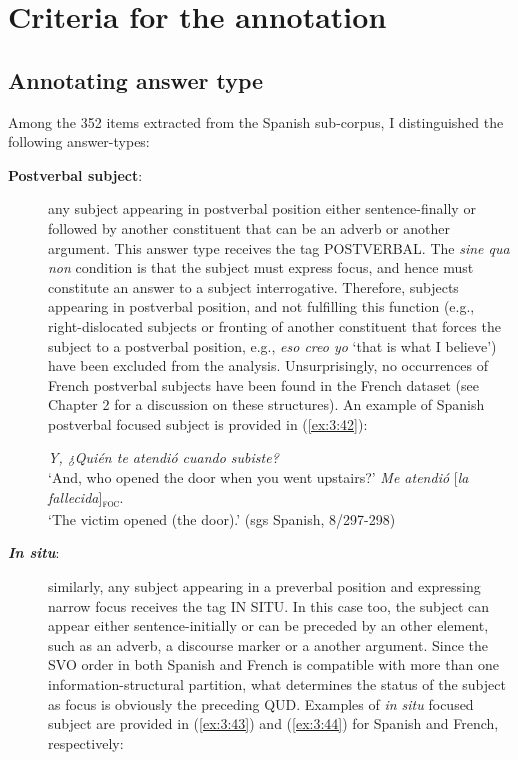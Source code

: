 \section{Criteria for the annotation}
\subsection{Annotating answer type}
Among the 352 items extracted from the Spanish sub-corpus, I distinguished the following answer-types: 

\begin{description}
    \item[\textbf{Postverbal subject}:] any subject appearing in postverbal position either sentence-finally or followed by another constituent that can be an adverb or another argument. This answer type receives the tag {\selectfont POSTVERBAL}. The \textit{sine qua non} condition is that the subject must express focus, and hence must constitute an answer to a subject interrogative. Therefore, subjects appearing in postverbal position, and not fulfilling this function (e.g., right-dislocated subjects or fronting of another constituent that forces the subject to a postverbal position, e.g., \textit{eso creo yo} `that is what I believe') have been excluded from the analysis. Unsurprisingly, no occurrences of French postverbal subjects have been found in the French dataset (see Chapter 2 for a discussion on these structures). An example of Spanish postverbal focused subject is provided in (\ref{ex:3:42}):
    
\ea \label{ex:3:42}
\ea \textit{Y, ¿Quién te atendió cuando subiste?} \\
 ‘And, who opened the door when you went upstairs?'
\ex \textit{Me atendió} [\textit{la fallecida}]\textsubscript{\textsc{foc}}\normalsize. \\
‘The victim opened (the door).' \hfill (sgs Spanish, 8/297-298)   
\z \z

\item[\textbf{\textit{In situ}}:] similarly, any subject appearing in a preverbal position and expressing narrow focus receives the tag {\selectfont IN SITU}. In this case too, the subject can appear either sentence-initially or can be preceded by an other element, such as an adverb, a discourse marker or a another argument. Since the SVO order in both Spanish and French is compatible with more than one information-structural partition, what determines the status of the subject as focus is obviously the preceding QUD. Examples of \textit{in situ} focused subject are provided in (\ref{ex:3:43}) and (\ref{ex:3:44}) for Spanish and French, respectively:


\end{description}
